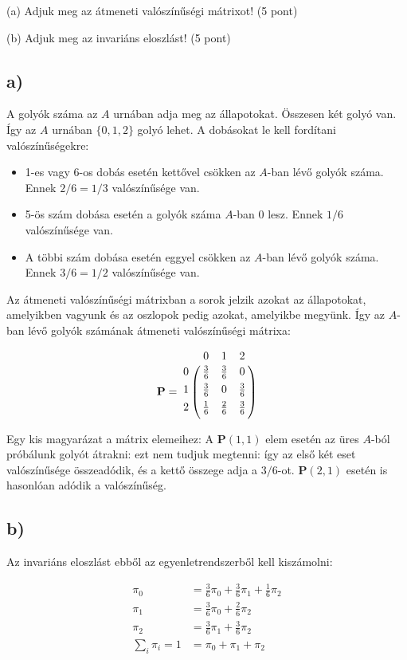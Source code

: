 \documentclass[a4paper,12pt]{article}
\begin{document}
(a) Adjuk meg az átmeneti valószínűségi mátrixot! (5 pont)

(b) Adjuk meg az invariáns eloszlást! (5 pont)

\subsection*{a)}
A golyók száma az $A$ urnában adja meg az állapotokat. Összesen két
golyó van. Így az $A$ urnában $\{0, 1, 2\}$ golyó lehet. A dobásokat le
kell fordítani valószínűségekre:

\begin{itemize}
\item 1-es vagy 6-os dobás esetén kettővel csökken az $A$-ban lévő golyók
száma. Ennek $2/6 = 1/3$ valószínűsége van.
\item 5-ös szám dobása esetén a golyók száma $A$-ban 0 lesz. Ennek 
$1/6$ valószínűsége van.
\item A többi szám dobása esetén eggyel csökken az $A$-ban lévő golyók
száma. Ennek $3/6 = 1/2$ valószínűsége van.
\end{itemize}

Az átmeneti valószínűségi mátrixban a sorok jelzik azokat az állapotokat,
amelyikben vagyunk és az oszlopok pedig azokat, amelyikbe megyünk. Így 
az $A$-ban lévő golyók számának átmeneti valószínűségi mátrixa:

\[
\mathbf{P} = 
\bordermatrix{
~	&	0			&	1			&	2   		\cr \\[0.4em]
0	&	\frac{3}{6}	&	\frac{3}{6}	&	0			\cr \\[0.4em]
1	&	\frac{3}{6}	&	0			&	\frac{3}{6}	\cr \\[0.4em]
2	&	\frac{1}{6}	&	\frac{2}{6}	&	\frac{3}{6}}
\]

Egy kis magyarázat a mátrix elemeihez:
A $\mathbf{P}(1, 1)$ elem esetén az üres $A$-ból próbálunk golyót átrakni: 
ezt nem tudjuk megtenni: így az első két eset valószínűsége összeadódik, és
a kettő összege adja a $3/6$-ot. $\mathbf{P}(2, 1)$ esetén is hasonlóan 
adódik a valószínűség.

\subsection*{b)}
Az invariáns eloszlást ebből az egyenletrendszerből kell kiszámolni:

\begin{align*}
\pi_0 &= \frac{3}{6} \pi_0 + \frac{3}{6}\pi_1 + \frac{1}{6}\pi_2 \\
\pi_1 &= \frac{3}{6} \pi_0 + \frac{2}{6} \pi_2 \\
\pi_2 &= \frac{3}{6} \pi_1 + \frac{3}{6} \pi_2 \\
\sum_{i}\pi_i = 1 &= \pi_0 + \pi_1 + \pi_2
\end{align*}
\end{document}
